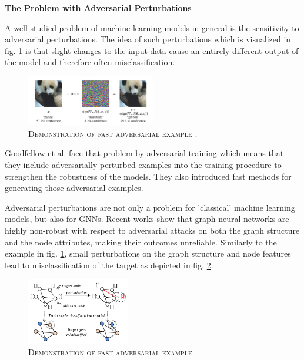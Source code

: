\documentclass[a4paper,preprint]{sig-alternate}
\begin{document}
\textbf{The Problem with Adversarial Perturbations}\newline

A well-studied problem of machine learning models in general is the sensitivity to adversarial perturbations.\cite{goodfellow2015explaining}
The idea of such perturbations which is visualized in fig. \ref{fig:adversarial_example} is that slight changes to the input data
cause an entirely different output of the model and therefore often misclassification.\newline

\begin{figure}[h]
    \centering
    \includegraphics[width=0.5\textwidth]{img/adversarial_example.png}
    \caption{\textsc{Demonstration of fast adversarial example} \cite{goodfellow2015explaining}.}
    \label{fig:adversarial_example}
\end{figure}

Goodfellow et al. \cite{goodfellow2015explaining} face that problem by adversarial training which means that they include adversarially 
perturbed examples into the training procedure to strengthen the robustness of the models. They also introduced fast methods for generating 
those adversarial examples.\newline

Adversarial perturbations are not only a problem for 'classical' machine learning models, but also for GNNs.
Recent works show that graph neural networks are highly non-robust with respect to adversarial attacks on both the graph
structure and the node attributes, making their outcomes unreliable.\cite{Z_gner_2019}\newline
Similarly to the example in fig. \ref{fig:adversarial_example}, small perturbations on the graph structure and node features lead to 
misclassification of the target as depicted in fig. \ref{fig:adversarial_GNN}.\newline

\begin{figure}[h]
    \centering
    \includegraphics[width=0.4\textwidth]{img/adversarial_GNN.png}
    \caption{\textsc{Demonstration of fast adversarial example} \cite{Z_gner_2019}.}
    \label{fig:adversarial_GNN}
\end{figure}
\end{document}
